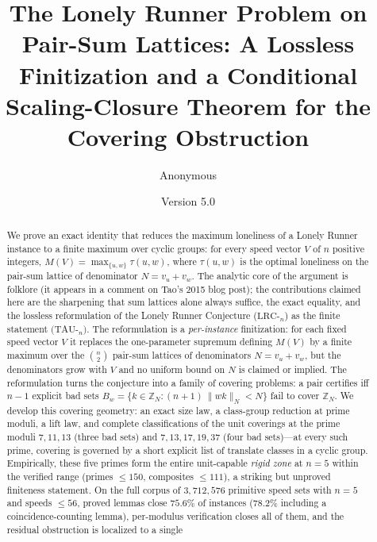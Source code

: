 \documentclass[11pt,a4paper]{article}
\numberwithin{equation}{section}
\theoremstyle{plain}
\theoremstyle{definition}
\theoremstyle{remark}
\newcommand{\Z}{\mathbb{Z}}
\newcommand{\wn}[1]{\lVert #1 \rVert_{N}}
\newcommand{\papertitle}{The Lonely Runner Problem on Pair-Sum Lattices: A Lossless
Finitization and a Conditional Scaling-Closure Theorem for the
Covering Obstruction}
\begin{document}
\title{\papertitle}
\author{Anonymous}
\date{Version 5.0}
\maketitle

\tableofcontents
\clearpage


\begin{abstract}
\noindent
We prove an exact identity that reduces the maximum loneliness of a Lonely
Runner instance to a finite maximum over cyclic groups: for every speed
vector $V$ of $n$ positive integers,
$M(V)=\max_{\{u,w\}}\tau(u,w)$, where $\tau(u,w)$ is the optimal loneliness
on the pair-sum lattice of denominator $N=v_u+v_w$. The analytic core of the
argument is folklore (it appears in a comment on Tao's 2015 blog post); the
contributions claimed here are the sharpening that sum lattices alone always
suffice, the exact equality, and the lossless reformulation of the Lonely
Runner Conjecture ($\mathrm{LRC}$-$_n$) as the finite statement
$(\mathrm{TAU}$-$_n)$. The reformulation is a \emph{per-instance}
finitization: for each fixed speed vector $V$ it replaces the
one-parameter supremum defining $M(V)$ by a finite maximum over the
$\binom{n}{2}$ pair-sum lattices of denominators $N=v_u+v_w$, but the
denominators grow with $V$ and no uniform bound on $N$ is claimed or
implied. The reformulation turns the conjecture into a family
of covering problems: a pair certifies iff $n-1$ explicit bad sets
$B_w=\{k\in\Z_N : (n{+}1)\,\wn{wk}<N\}$ fail to cover $\Z_N$. We develop
this covering geometry: an exact size law, a class-group reduction at prime
moduli, a lift law, and complete classifications of the unit coverings at
the prime moduli $7,11,13$ (three bad sets) and $7,13,17,19,37$ (four bad
sets)---at every such prime, covering is governed by a short explicit list
of translate classes in a cyclic group. Empirically, these five primes form
the entire unit-capable \emph{rigid zone} at $n=5$ within the verified range
(primes $\le 150$, composites $\le 111$), a striking but unproved finiteness
statement. On the full corpus of $3{,}712{,}576$ primitive speed sets with
$n=5$ and speeds $\le 56$, proved lemmas close $75.6\%$ of instances
($78.2\%$ including a coincidence-counting lemma), per-modulus verification
closes all of them, and the residual obstruction is localized to a single

\end{abstract}
\end{document}
